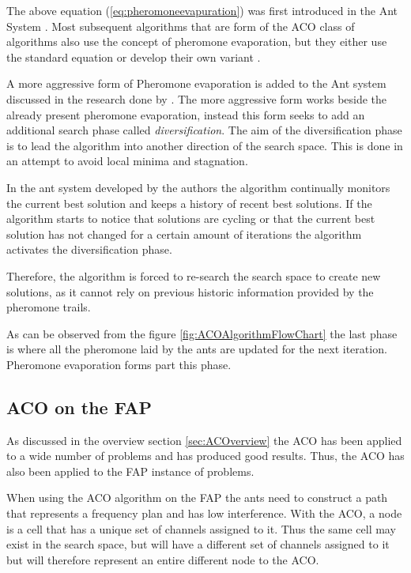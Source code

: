 The above equation (\ref{eq:pheromoneevapuration}) was first introduced in the Ant System \cite{CompuIntelligenceIntro,AntsAndStigmergy,AntIntroTrends,AntSurvey}. Most subsequent algorithms that are form of the ACO class of algorithms also use the concept of pheromone evaporation, but they either use the standard equation or develop their own variant \cite{CompuIntelligenceIntro,AntsAndStigmergy,AntIntroTrends,AntSurvey}.

A more aggressive form of Pheromone evaporation  is added to the Ant system discussed in the research done by \cite{AntQAP}. The more aggressive form works beside the already present pheromone evaporation, instead this form seeks to add an additional search phase called \emph{diversification}\cite{AntQAP}. The aim of the diversification phase is to lead the algorithm into another direction of the search space\cite{AntQAP}. This is done in an attempt to avoid local minima and stagnation\cite{AntQAP}.

In the ant system developed by the authors the algorithm continually monitors the current best solution and keeps a history of recent best solutions\cite{AntQAP}. If the algorithm starts to notice that solutions are cycling or that the current best solution has not changed for a certain amount of iterations the algorithm activates the diversification phase\cite{AntQAP}. 

Therefore, the algorithm is forced to re-search the search space to create new solutions, as it cannot rely on previous historic information provided by the pheromone trails\cite{AntQAP}.

As can be observed from the figure \ref{fig:ACOAlgorithmFlowChart} the last phase is where all the pheromone laid by the ants are updated for the next iteration. Pheromone evaporation forms part this phase.
\subsection{ACO on the FAP}
As discussed in the overview section \ref{sec:ACOverview} the ACO has been applied to a wide number of problems and has produced good results. Thus, the ACO has also been applied to the FAP instance of problems.

When using the ACO algorithm on the FAP the ants need to construct a path that represents a frequency plan and has low interference. With the ACO, a node is a cell that has a unique set of channels assigned to it. Thus the same cell may exist in the search space, but will have a different set of channels assigned to it but will therefore represent an entire different node to the ACO.

